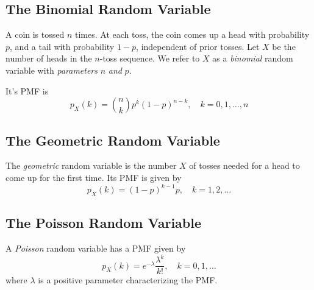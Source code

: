 \documentclass{tufte-handout}
\theoremstyle{definition} \newtheorem{definition}{Definition}
\theoremstyle{definition} \newtheorem{remark}{Remark}
\theoremstyle{definition} \newtheorem{example}{Example}
\newcommand{\pmf}[2]{p_#1\left(#2\right)}
\begin{document}
\subsection{The Binomial Random Variable}
A coin is tossed $n$ times. At each toss, the coin comes up a head with
probability $p$, and a tail with probability $1 - p$, independent of prior
tosses. Let $X$ be the number of heads in the $n$-toss sequence. We refer
to $X$ as a \emph{binomial} random variable with \emph{parameters} $n$
\emph{and} $p$.

It's PMF is
\begin{equation*}
  \pmf{X}{k} = \binom{n}{k} p^k {(1 - p)}^{n - k}, \quad k = 0,1, \ldots, n
\end{equation*}

\subsection{The Geometric Random Variable}
The \emph{geometric} random variable is the number $X$ of tosses needed
for a head to come up for the first time. Its PMF is given by
\begin{equation*}
  \pmf{X}{k} = {(1 - p)}^{k - 1} p, \quad k = 1, 2, \ldots
\end{equation*}

\subsection{The Poisson Random Variable}
A \emph{Poisson} random variable has a PMF given by
\begin{equation*}
  \pmf{X}{k} = e^{-\lambda} \frac{\lambda^k}{k!},\quad k = 0,1, \ldots
\end{equation*}
where $\lambda$ is a positive parameter characterizing the PMF.
\end{document}
